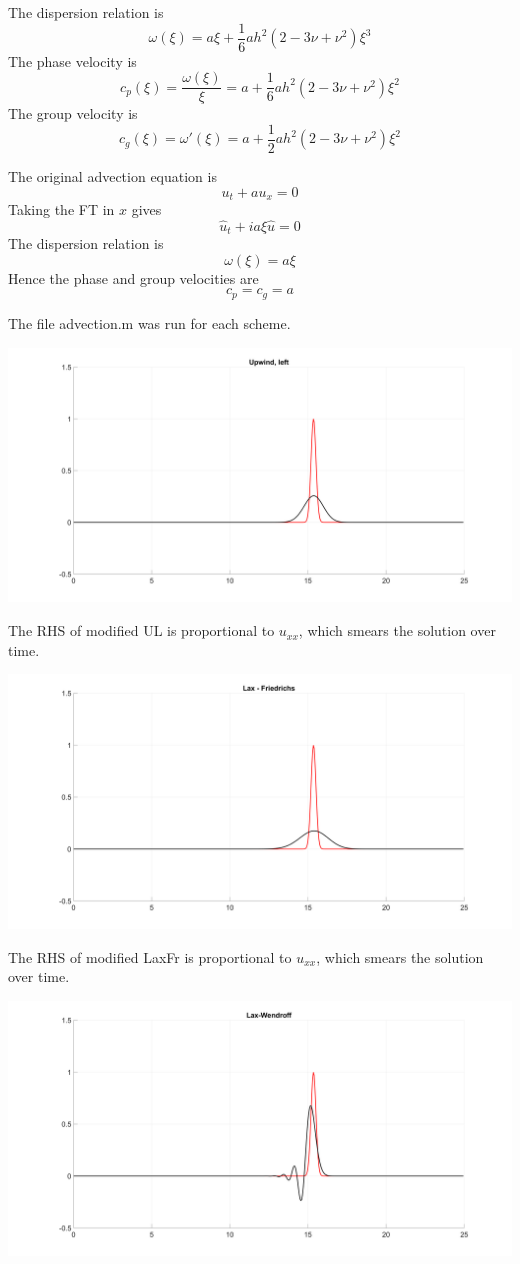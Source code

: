 \documentclass{article}
\begin{document}
\begin{enumerate}[label=(\alph*)]
The dispersion relation is
$$\omega(\xi) = a\xi + \frac16ah^2(2-3\nu+\nu^2)\xi^3$$
The phase velocity is
$$c_p(\xi) = \frac{\omega(\xi)}{\xi} = a + \frac16ah^2(2-3\nu+\nu^2)\xi^2$$
The group velocity is
$$c_g(\xi) = \omega'(\xi) = a + \frac12ah^2(2-3\nu+\nu^2)\xi^2$$

The original advection equation is
$$u_t + au_x = 0$$
Taking the FT in $x$ gives
$$\hat u_t + ia\xi\hat u = 0$$
The dispersion relation is
$$\omega(\xi) = a\xi$$
Hence the phase and group velocities are
$$c_p = c_g = a$$

The file advection.m was run for each scheme.

\begin{center}
	\includegraphics[scale=.2]{hw11 UL}
\end{center}
The RHS of modified UL is proportional to $u_{xx}$, which smears the solution over time.
\begin{center}
	\includegraphics[scale=.2]{hw11 LaxFr}
\end{center}
The RHS of modified LaxFr is proportional to $u_{xx}$, which smears the solution over time.
\begin{center}
	\includegraphics[scale=.2]{hw11 LW}

\end{center}
\end{enumerate}
\end{document}
